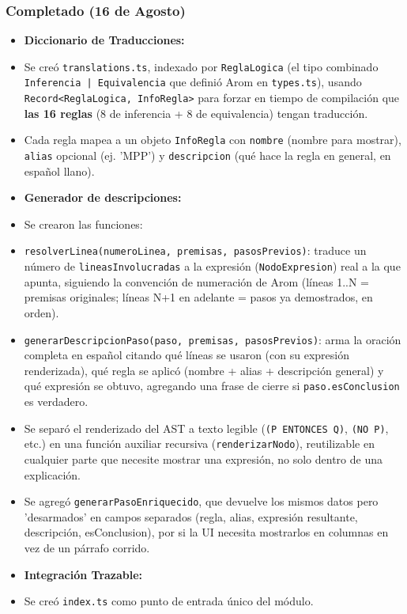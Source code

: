 \documentclass[11pt,a4paper,openany]{book}
\begin{document}
\subsubsection{Completado (16 de Agosto)}
\begin{itemize}[leftmargin=*]
\item \textbf{Diccionario de Traducciones:}
\item Se creó \texttt{translations.ts}, indexado por \texttt{ReglaLogica} (el tipo combinado \texttt{Inferencia | Equivalencia} que definió Arom en \texttt{types.ts}), usando \texttt{Record<ReglaLogica, InfoRegla>} para forzar en tiempo de compilación que \textbf{las 16 reglas} (8 de inferencia + 8 de equivalencia) tengan traducción.
\item Cada regla mapea a un objeto \texttt{InfoRegla} con \texttt{nombre} (nombre para mostrar), \texttt{alias} opcional (ej. 'MPP') y \texttt{descripcion} (qué hace la regla en general, en español llano).
\item \textbf{Generador de descripciones:}
\item Se crearon las funciones:
\item \texttt{resolverLinea(numeroLinea, premisas, pasosPrevios)}: traduce un número de \texttt{lineasInvolucradas} a la expresión (\texttt{NodoExpresion}) real a la que apunta, siguiendo la convención de numeración de Arom (líneas 1..N = premisas originales; líneas N+1 en adelante = pasos ya demostrados, en orden).
\item \texttt{generarDescripcionPaso(paso, premisas, pasosPrevios)}: arma la oración completa en español citando qué líneas se usaron (con su expresión renderizada), qué regla se aplicó (nombre + alias + descripción general) y qué expresión se obtuvo, agregando una frase de cierre si \texttt{paso.esConclusion} es verdadero.
\item Se separó el renderizado del AST a texto legible (\texttt{(P ENTONCES Q)}, \texttt{(NO P)}, etc.) en una función auxiliar recursiva (\texttt{renderizarNodo}), reutilizable en cualquier parte que necesite mostrar una expresión, no solo dentro de una explicación.
\item Se agregó \texttt{generarPasoEnriquecido}, que devuelve los mismos datos pero 'desarmados' en campos separados (regla, alias, expresión resultante, descripción, esConclusion), por si la UI necesita mostrarlos en columnas en vez de un párrafo corrido.
\item \textbf{Integración Trazable:}
\item Se creó \texttt{index.ts} como punto de entrada único del módulo.

\end{itemize}
\end{document}
